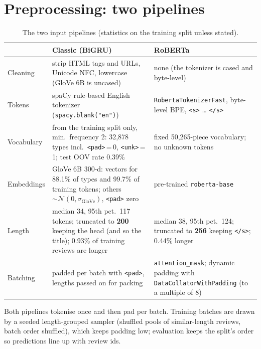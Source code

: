 \documentclass[10pt,a4paper]{article}
\newcommand{\code}[1]{\texttt{#1}}
\begin{document}
\section{Preprocessing: two pipelines}

\begin{table}[!htbp]
\centering\small
\begin{tabularx}{\textwidth}{@{}l>{\raggedright\arraybackslash}X>{\raggedright\arraybackslash}X@{}}
\toprule
 & \textbf{Classic (BiGRU)} & \textbf{RoBERTa} \\
\midrule
Cleaning & strip HTML tags and URLs, Unicode NFC, lowercase (GloVe 6B is uncased) & none (the tokenizer is cased and byte-level) \\
Tokens & spaCy rule-based English tokenizer (\code{spacy.blank("en")}) & \code{RobertaTokenizerFast}, byte-level BPE, \code{<s>} \ldots{} \code{</s>} \\
Vocabulary & from the training split only, min.\ frequency 2: 32{,}878 types incl.\ \code{<pad>}\,=\,0, \code{<unk>}\,=\,1; test OOV rate 0.39\% & fixed 50{,}265-piece vocabulary; no unknown tokens \\
Embeddings & GloVe 6B 300-d: vectors for 88.1\% of types and 99.7\% of training tokens; others $\sim\mathcal{N}(0,\sigma_{\text{GloVe}})$, \code{<pad>} zero & pre-trained \code{roberta-base} \\
Length & median 34, 95th pct.\ 117 tokens; truncated to \textbf{200} keeping the head (and so the title); 0.93\% of training reviews are longer & median 38, 95th pct.\ 124; truncated to \textbf{256} keeping \code{</s>}; 0.44\% longer \\
Batching & padded per batch with \code{<pad>}, lengths passed on for packing & \code{attention\_mask}; dynamic padding with \code{DataCollatorWithPadding} (to a multiple of 8) \\
\bottomrule
\end{tabularx}
\caption{The two input pipelines (statistics on the training split unless stated).}
\label{tab:prep}
\end{table}
\vspace{-6pt}
Both pipelines tokenise once and then pad per batch. Training batches are drawn by a seeded length-grouped sampler
(shuffled pools of similar-length reviews, batch order shuffled), which keeps padding low; evaluation keeps the
split's order so predictions line up with review ids.
\end{document}
